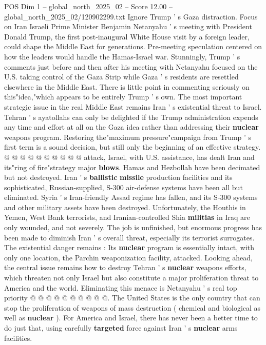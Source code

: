 \begin{textsample}{POS Dim 1 – global\_north\_2025\_02 – Score 12.00 – global\_north\_2025\_02/120902299.txt}  \label{ex:f1_pos_438}
Ignore Trump ' s Gaza distraction.
Focus on Iran Israeli Prime Minister Benjamin Netanyahu ' s meeting with President Donald Trump, the first post-inaugural White House visit by a foreign leader, could shape the Middle East for generations.
Pre-meeting speculation centered on how the leaders would handle the Hamas-Israel war.
Stunningly, Trump ' s comments just before and then after his meeting with Netanyahu focused on the U.S. taking control of the Gaza Strip while Gaza ' s residents are resettled elsewhere in the Middle East.
There is little point in commenting seriously on this"idea,"which appears to be entirely Trump ' s own.
The most important strategic issue in the real Middle East remains Iran ' s existential threat to Israel.
Tehran ' s ayatollahs can only be delighted if the Trump administration expends any time and effort at all on the Gaza idea rather than addressing their \textbf{nuclear} weapons program.
Restoring the"maximum pressure"campaign from Trump ' s first term is a sound decision, but still only the beginning of an effective strategy. @ @ @ @ @ @ @ @ @ @ attack, Israel, with U.S. assistance, has dealt Iran and its"ring of fire"strategy major \textbf{blows}.
Hamas and Hezbollah have been decimated but not destroyed.
Iran ' s \textbf{ballistic} \textbf{missile} production facilities and its sophisticated, Russian-supplied, S-300 air-defense systems have been all but eliminated.
Syria ' s Iran-friendly Assad regime has fallen, and its S-300 systems and other military assets have been destroyed.
Unfortunately, the Houthis in Yemen, West Bank terrorists, and Iranian-controlled Shia \textbf{militias} in Iraq are only wounded, and not severely.
The job is unfinished, but enormous progress has been made to diminish Iran ' s overall threat, especially its terrorist surrogates.
The existential danger remains : Its \textbf{nuclear} program is essentially intact, with only one location, the Parchin weaponization facility, attacked.
Looking ahead, the central issue remains how to destroy Tehran ' s \textbf{nuclear} weapons efforts, which threaten not only Israel but also constitute a major proliferation threat to America and the world.
Eliminating this menace is Netanyahu ' s real top priority @ @ @ @ @ @ @ @ @ @.
The United States is the only country that can stop the proliferation of weapons of mass destruction ( chemical and biological as well as \textbf{nuclear} ).
For America and Israel, there has never been a better time to do just that, using carefully \textbf{targeted} force against Iran ' s \textbf{nuclear} arms facilities.

\end{textsample}
